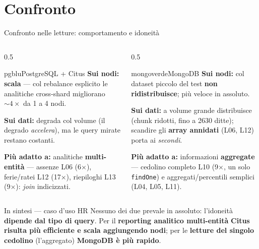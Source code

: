 \documentclass[aspectratio=169,11pt]{beamer}
\begin{document}
\section{Confronto}
\begin{frame}{Confronto nelle letture: comportamento e idoneità}
  \begin{columns}[T]
    \begin{column}{0.5\textwidth}
      \begin{sysblock}{pgblu}{PostgreSQL + Citus}
        \footnotesize
        \textbf{Sui nodi:} \textcolor{pgblu}{\textbf{scala}} --- col rebalance esplicito le analitiche cross-shard migliorano ${\sim}4\times$ da 1 a 4 nodi.
        \par\smallskip
        \textbf{Sui dati:} degrada col volume (il degrado \emph{accelera}), ma le query mirate restano costanti.
        \par\smallskip
        \textbf{Più adatto a:} analitiche \textcolor{pgblu}{\textbf{multi-entità}} --- assenze L06 (6$\times$), ferie/ratei L12 (17$\times$), riepiloghi L13 (9$\times$): \emph{join} indicizzati.
      \end{sysblock}
    \end{column}
    \begin{column}{0.5\textwidth}
      \begin{sysblock}{mongoverde}{MongoDB}
        \footnotesize
        \textbf{Sui nodi:} col dataset piccolo del test \textcolor{mongoverde}{\textbf{non ridistribuisce}}; più veloce in assoluto.
        \par\smallskip
        \textbf{Sui dati:} a volume grande distribuisce (chunk ridotti, fino a 2630 ditte); scandire gli \textbf{array annidati} (L06, L12) porta ai \emph{secondi}.
        \par\smallskip
        \textbf{Più adatto a:} informazioni \textcolor{mongoverde}{\textbf{aggregate}} --- cedolino completo L10 (9$\times$, un solo \texttt{findOne}) e aggregati/percentili semplici (L04, L05, L11).
      \end{sysblock}
    \end{column}
  \end{columns}
  \begin{keyblock}{In sintesi --- caso d'uso HR}
    \footnotesize Nessuno dei due prevale in assoluto: l'idoneità \textbf{dipende dal tipo di query}. 
    Per il \textbf{reporting analitico multi-entità} \textcolor{pgblu}{\textbf{Citus risulta più efficiente e scala aggiungendo nodi}}; per le \textbf{letture del singolo cedolino} (l'aggregato) \textcolor{mongoverde}{\textbf{MongoDB è più rapido}}.
  \end{keyblock}
\end{frame}
\end{document}
